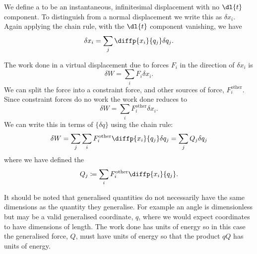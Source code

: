 \documentclass[fleqn]{NotesClass}
\newcommand*{\other}{\mathrm{other}}
\begin{document}
    We define a  to be an instantaneous, infinitesimal displacement with no \(\dl{t}\) component.
    To distinguish from a normal displacement we write this as \(\delta x_i\).
    Again applying the chain rule, with the \(\dl{t}\) component vanishing, we have
    \begin{equation}
        \delta x_i = \sum_j \diffp{x_i}{q_j}\delta q_j.
    \end{equation}
    
    The work done in a virtual displacement due to forces \(F_i\) in the direction of \(\delta x_i\) is
    \begin{equation}
        \delta W = \sum_i F_i\delta x_i.
    \end{equation}
    We can split the force into a constraint force, and other sources of force, \(F_i^{\other}\).
    Since constraint forces do no work the work done reduces to
    \begin{equation}
        \delta W = \sum_{i} F_{i}^{\other} \delta x_i.
    \end{equation}
    We can write this in terms of \(\{\delta q\}\) using the chain rule:
    \begin{equation}
        \delta W = \sum_j \sum_i F_i^{\other} \diffp{x_i}{q_j}\delta q_j = \sum_j Q_j \delta q_j
    \end{equation}
    where we have defined the 
    \begin{equation}
        Q_j \coloneqq \sum_{i}F_i^{\other} \diffp{x_i}{q_j}.
    \end{equation}
    
    It should be noted that generalised quantities do not necessarily have the same dimensions as the quantity they generalise.
    For example an angle is dimensionless but may be a valid generalised coordinate, \(q\), where we would expect coordinates to have dimensions of length.
    The work done has units of energy so in this case the generalised force, \(Q\), must have units of energy so that the product \(qQ\) has units of energy.
    
\end{document}
